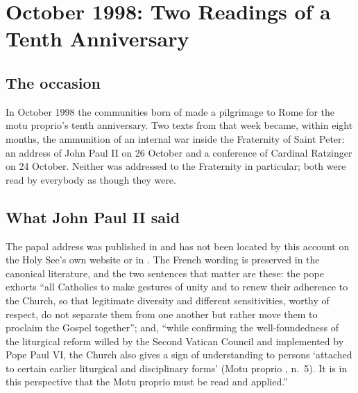\section{October 1998: Two Readings of a Tenth Anniversary}

\subsection{The occasion}

In October 1998 the communities born of  made a
pilgrimage to Rome for the motu proprio's tenth anniversary. Two texts
from that week became, within eight months, the ammunition of an internal
war inside the Fraternity of Saint Peter: an address of John Paul II on
26 October and a conference of Cardinal Ratzinger on 24 October. Neither
was addressed to the Fraternity in particular; both were read by
everybody as though they were.

\subsection{What John Paul II said}

The papal address was published in  and has
not been located by this account on the Holy See's own website or in
. The French wording is preserved in the
canonical literature, and the two sentences that matter are these: the
pope exhorts ``all Catholics to make gestures of unity and to renew their
adherence to the Church, so that legitimate diversity and different
sensitivities, worthy of respect, do not separate them from one another
but rather move them to proclaim the Gospel together''; and, ``while
confirming the well-foundedness of the liturgical reform willed by the
Second Vatican Council and implemented by Pope Paul VI, the Church also
gives a sign of understanding to persons `attached to certain earlier
liturgical and disciplinary forms' (Motu proprio ,
n.~5). It is in this perspective that the Motu proprio  must be read and applied.''

